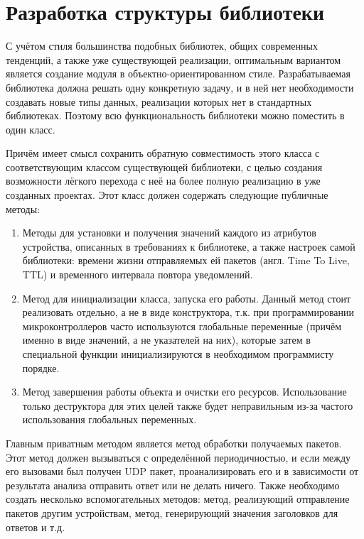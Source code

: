 \section{Разработка структуры библиотеки}

С учётом стиля большинства подобных библиотек, общих современных тенденций, а также уже существующей реализации, оптимальным вариантом является создание модуля в объектно-ориентированном стиле.
Разрабатываемая библиотека должна решать одну конкретную задачу, и в ней нет необходимости создавать новые типы данных, реализации которых нет в стандартных библиотеках.
Поэтому всю функциональность библиотеки можно поместить в один класс.

Причём имеет смысл сохранить обратную совместимость этого класса с соответствующим классом существующей библиотеки, с целью создания возможности лёгкого перехода с неё на более полную реализацию в уже созданных проектах.
Этот класс должен содержать следующие публичные методы:

\begin{enumerate}
	\item Методы для установки и получения значений каждого из атрибутов устройства, описанных в требованиях к библиотеке, а также настроек самой библиотеки: времени жизни отправляемых ей пакетов (англ. Time To Live, TTL) и временного интервала повтора уведомлений.
	\item Метод для инициализации класса, запуска его работы.
	Данный метод стоит реализовать отдельно, а не в виде конструктора, т.к. при программировании микроконтроллеров часто используются глобальные переменные (причём именно в виде значений, а не указателей на них), которые затем в специальной функции инициализируются в необходимом программисту порядке.
	\item Метод завершения работы объекта и очистки его ресурсов.
	Использование только деструктора для этих целей также будет неправильным из-за частого использования глобальных переменных.
\end{enumerate}

Главным приватным методом является метод обработки получаемых пакетов.
Этот метод должен вызываться с определённой периодичностью, и если между его вызовами был получен UDP пакет, проанализировать его и в зависимости от результата анализа отправить ответ или не делать ничего.
Также необходимо создать несколько вспомогательных методов: метод, реализующий отправление пакетов другим устройствам, метод, генерирующий значения заголовков для ответов и т.д.

